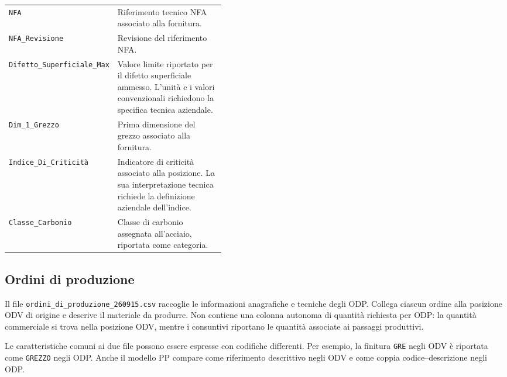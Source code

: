 \begin{longtable}{@{}p{0.43\linewidth}p{}@{}}
\texttt{NFA} & Riferimento tecnico NFA associato alla fornitura. \\
\texttt{NFA\_Revisione} & Revisione del riferimento NFA. \\
\texttt{Difetto\_Superficiale\_Max} & Valore limite riportato per il difetto superficiale ammesso. L'unità e i valori convenzionali richiedono la specifica tecnica aziendale. \\
\texttt{Dim\_1\_Grezzo} & Prima dimensione del grezzo associato alla fornitura. \\
\texttt{Indice\_Di\_Criticità} & Indicatore di criticità associato alla posizione. La sua interpretazione tecnica richiede la definizione aziendale dell'indice. \\
\texttt{Classe\_Carbonio} & Classe di carbonio assegnata all'acciaio, riportata come categoria. \\
\end{longtable}
\endgroup

\subsection{Ordini di produzione}
\label{sec:production-order-data}

Il file \nolinkurl{ordini_di_produzione_260915.csv} raccoglie le informazioni anagrafiche e tecniche degli ODP. Collega ciascun ordine alla posizione ODV di origine e descrive il materiale da produrre. Non contiene una colonna autonoma di quantità richiesta per ODP: la quantità commerciale si trova nella posizione ODV, mentre i consuntivi riportano le quantità associate ai passaggi produttivi.

Le caratteristiche comuni ai due file possono essere espresse con codifiche differenti. Per esempio, la finitura \texttt{GRE} negli ODV è riportata come \texttt{GREZZO} negli ODP. Anche il modello PP compare come riferimento descrittivo negli ODV e come coppia codice--descrizione negli ODP.

